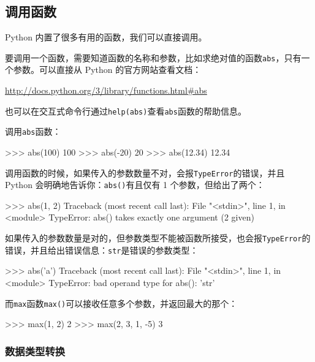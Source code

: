 \hypertarget{ux8c03ux7528ux51fdux6570}{%
\subsection{调用函数}\label{ux8c03ux7528ux51fdux6570}}

Python 内置了很多有用的函数，我们可以直接调用。

要调用一个函数，需要知道函数的名称和参数，比如求绝对值的函数\texttt{abs}，只有一个参数。可以直接从
Python 的官方网站查看文档：

\url{http://docs.python.org/3/library/functions.html\#abs}

也可以在交互式命令行通过\texttt{help(abs)}查看\texttt{abs}函数的帮助信息。

调用\texttt{abs}函数：

\begin{pythoncode}
>>> abs(100)
100
>>> abs(-20)
20
>>> abs(12.34)
12.34
\end{pythoncode}

调用函数的时候，如果传入的参数数量不对，会报\texttt{TypeError}的错误，并且
Python 会明确地告诉你：\texttt{abs()}有且仅有 1 个参数，但给出了两个：

\begin{pythoncode}
>>> abs(1, 2)
Traceback (most recent call last):
  File "<stdin>", line 1, in <module>
TypeError: abs() takes exactly one argument (2 given)
\end{pythoncode}

如果传入的参数数量是对的，但参数类型不能被函数所接受，也会报\texttt{TypeError}的错误，并且给出错误信息：\texttt{str}是错误的参数类型：

\begin{pythoncode}
>>> abs('a')
Traceback (most recent call last):
  File "<stdin>", line 1, in <module>
TypeError: bad operand type for abs(): 'str'
\end{pythoncode}

而\texttt{max}函数\texttt{max()}可以接收任意多个参数，并返回最大的那个：

\begin{pythoncode}
>>> max(1, 2)
2
>>> max(2, 3, 1, -5)
3
\end{pythoncode}

\hypertarget{ux6570ux636eux7c7bux578bux8f6cux6362}{%
\subsubsection{数据类型转换}\label{ux6570ux636eux7c7bux578bux8f6cux6362}}

